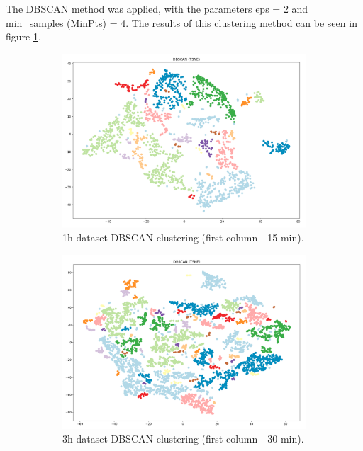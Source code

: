 The DBSCAN method was applied, with the parameters eps = 2 and min\_samples (MinPts) = 4. The results of this clustering method can be seen in figure \ref{figure:DBSCANResults}.


\begin{figure}[H]
  \centering
  \begin{subfigure}{.5\textwidth}\captionsetup{width=.8\linewidth}
    \centering
    \includegraphics[width=1\textwidth]{./images/clusteringResults/1h-1-DBSCAN.png}
  \caption{1h dataset DBSCAN clustering (first column - 15 min).}
  \end{subfigure}%
  \hfill
  \begin{subfigure}{.5\textwidth}\captionsetup{width=.8\linewidth}
    \centering
    \includegraphics[width=1\textwidth]{./images/clusteringResults/3h-1-DBSCAN.png}
    \caption{3h dataset DBSCAN clustering (first column - 30 min).}
  \end{subfigure}
  \caption{}
  \label{figure:DBSCANResults}
  \end{figure}






